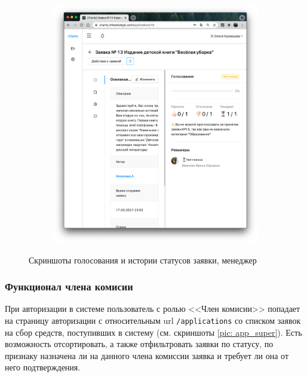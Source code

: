 \documentclass[a4paper,12pt,reqno]{article}
\begin{document}
\begin{figure}[H]
\begin{subfigure}[b]{0.475\linewidth}
			\includegraphics[width=\linewidth]{img/ro/application_m_vote.png}
		\end{subfigure}
		\caption{Скриншоты голосования и истории статусов заявки, менеджер}
		\label{pic: application_tabs_1}
	\end{figure}
	

    \subsubsection{Функционал члена комисии}
    
    При авторизации в системе пользователь с ролью <<Член комисии>> попадает на страницу авторизации с относительным url \texttt{/applications} со списком заявок на сбор средств, поступивших в систему (см. скриншоты \ref{pic: app_super}). Есть возможность отсортировать, а также отфильтровать заявки по статусу, по признаку назначена ли на данного члена комиссии заявка и требует ли она от него подтверждения.
    
\end{document}
